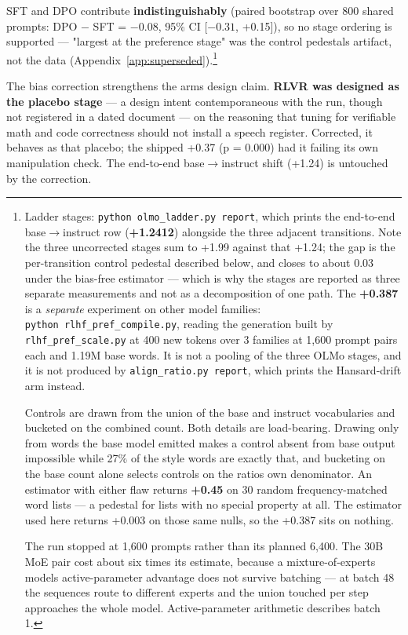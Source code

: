 SFT and DPO contribute \textbf{indistinguishably} (paired
bootstrap over 800 shared prompts: DPO \(-\) SFT = \(-0.08\), 95\% CI {[}\(-0.31\), +0.15{]}),
so no stage ordering is supported --- "largest at the preference stage" was the
control pedestal\textquotesingle s artifact, not the data (Appendix~\ref{app:superseded}).\footnote{Ladder stages: \texttt{python\ olmo\_\allowbreak{}ladder.\allowbreak{}py\ report}, which prints the
  end-to-end base\(\rightarrow\)instruct row (\textbf{+1.2412}) alongside the three adjacent
  transitions. Note the three uncorrected stages sum to +1.99 against that +1.24;
  the gap is the per-transition control pedestal described below, and closes
  to about 0.03 under the bias-free estimator --- which is why the stages are
  reported as three separate measurements and not as a decomposition of one
  path. The \textbf{+0.387} is a \emph{separate} experiment on other model
  families: \texttt{python\ rlhf\_\allowbreak{}pref\_\allowbreak{}compile.\allowbreak{}py}, reading the generation built by
  \texttt{rlhf\_pref\_scale.py} at 400 new tokens over 3 families at 1,600 prompt
  pairs each and 1.19M base words. It is not a pooling of the three OLMo
  stages, and it is not produced by \texttt{align\_ratio.py\ report}, which prints the
  Hansard-drift arm instead.

  Controls are drawn from the union of the base and instruct vocabularies and
  bucketed on the combined count. Both details are load-bearing. Drawing only
  from words the base model emitted makes a control absent from base output
  impossible while 27\% of the style words are exactly that, and bucketing on
  the base count alone selects controls on the ratio\textquotesingle s own denominator. An
  estimator with either flaw returns \textbf{+0.45} on 30 random
  frequency-matched word lists --- a pedestal for lists with no special
  property at all. The estimator used here returns +0.003 on those same
  nulls, so the +0.387 sits on nothing.

  The run stopped at 1,600 prompts rather than its planned 6,400. The 30B MoE
  pair cost about six times its estimate, because a mixture-of-experts model\textquotesingle s
  active-parameter advantage does not survive batching --- at batch 48 the
  sequences route to different experts and the union touched per step
  approaches the whole model. Active-parameter arithmetic describes batch 1.}

The bias correction strengthens the arm\textquotesingle s design claim. \textbf{RLVR was designed as the
placebo stage} --- a design intent contemporaneous with the run, though not
registered in a dated document --- on the reasoning that tuning for verifiable
math and code correctness should not install a speech register. Corrected, it
behaves as that placebo; the shipped +0.37 (p = 0.000) had it failing its own
manipulation check. The end-to-end base\(\rightarrow\)instruct shift (+1.24) is untouched by
the correction.

